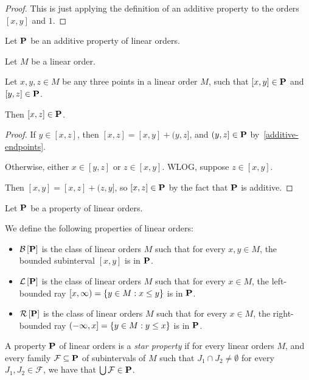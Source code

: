 \begin{proof}
  This is just applying the definition of an additive property
  to the orders $[x, y]$ and $1$.
\end{proof}

\begin{corollary}\label{additive-transitivity}
  Let $\mathbf{P}$ be an additive property of linear orders.

  Let $M$ be a linear order.

  Let $x, y, z \in M$ be any three points in a linear order $M$,
  such that $[x, y] \in \mathbf{P}$ and $[y, z] \in \mathbf{P}$.

  Then $[x, z] \in \mathbf{P}$.
\end{corollary}

\begin{proof}
  If $y \in [x, z]$, then $[x, z] = [x, y] + (y, z]$,
  and $(y, z] \in \mathbf{P}$ by~\cref{additive-endpoints}.

  Otherwise, either $x \in [y, z]$ or $z \in [x, y]$.
  WLOG, suppose $z \in [x, y]$.

  Then $[x, y] = [x, z] + (z, y]$,
  so $[x, z] \in \mathbf{P}$ by the fact that $\mathbf{P}$ is additive.
\end{proof}

\begin{definitions}\label{bounded-definitions}
  Let $\mathbf{P}$ be a property of linear orders.

  We define the following properties of linear orders:
  \begin{itemize}
    \item $\mathcal{B} \left[ {{\mathbf{P}}} \right]$ is the class of linear orders $M$ such that for every $x, y \in M$,
          the bounded subinterval $[x, y]$ is in $\mathbf{P}$.
    \item $\mathcal{L} \left[ {{\mathbf{P}}} \right]$ is the class of linear orders $M$ such that for every $x \in M$,
          the left-bounded ray $[x, \infty) = \left\{ {y \in M : x \le y} \right\}$ is in $\mathbf{P}$.
    \item $\mathcal{R} \left[ {{\mathbf{P}}} \right]$ is the class of linear orders $M$ such that for every $x \in M$,
          the right-bounded ray $(-\infty, x] = \left\{ {y \in M : y \le x} \right\}$ is in $\mathbf{P}$.
  \end{itemize}
\end{definitions}

\begin{definition}
  A property $\mathbf{P}$ of linear orders is a \emph{star property} if
  for every linear orders $M$, and every family $\mathcal{F} \subseteq \mathbf{P}$
  of subintervals of $M$ such that $J_1 \cap J_2 \ne \emptyset$
  for every $J_1, J_2 \in \mathcal{F}$, we have that
  $\bigcup \mathcal{F} \in \mathbf{P}$.
\end{definition}

